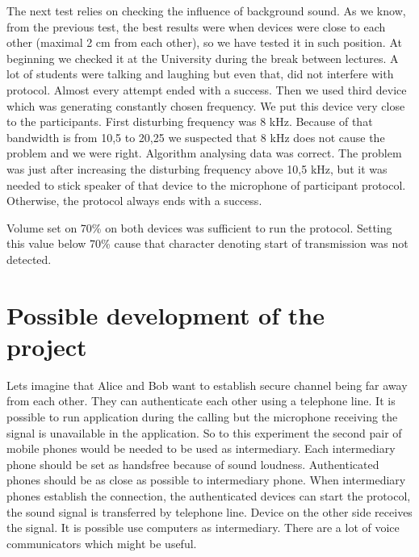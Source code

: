 \documentclass[11pt,titlepage]{article}
\theoremstyle{plain}
\begin{document}
The next test relies on checking the influence of background sound. As we know, from the previous test, the best results were when devices were close to each other (maximal 2 cm from each other), so we have tested it in such position. At beginning we checked it at the University during the break between lectures. A lot of students were talking and laughing but even that, did not interfere with protocol. Almost every attempt ended with a success. Then we used third device which was generating constantly chosen frequency. We put this device very close to the participants. First disturbing frequency was 8 kHz. Because of that bandwidth is from 10,5 to 20,25 we suspected that 8 kHz does not cause the problem and we were right. Algorithm analysing data was correct. The problem was just after increasing the disturbing frequency above 10,5 kHz, but it was needed to stick speaker of that device to the microphone of participant protocol. Otherwise, the protocol always ends with a success. 

\vspace{5mm}

Volume set on 70\% on both devices was sufficient to run the protocol. Setting this value below 70\% cause that character denoting start of transmission was not detected.

\section{Possible development of the project}
Lets imagine that Alice and Bob want to establish secure channel being far away from each other. They can authenticate each other using a telephone line. It is possible to run application during the calling but the microphone receiving the signal is unavailable in the application. So to this experiment the second pair of mobile phones would be needed to be used as intermediary. Each intermediary phone should be set as handsfree because of sound loudness. Authenticated phones should be as close as possible to intermediary phone. When intermediary phones establish the connection, the authenticated devices can start the protocol, the sound signal is transferred by telephone line. Device on the other side receives the signal. It is possible use computers as intermediary. There are a lot of voice communicators which might be useful.

\vspace{5mm}
\end{document}

